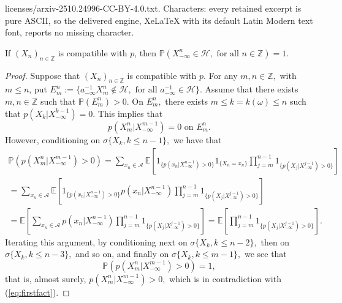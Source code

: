 \documentclass[10pt,a4paper]{amsart}
\def\P{{\mathbb P}}
\newcommand{\A}{\mathcal{A}}
\newcommand{\E}{\mathbb{E}}
\newcommand{\Z}{\mathbb{Z}}
\renewcommand{\H}{\mathcal{H}}
\begin{document}
licenses/arxiv-2510.24996-CC-BY-4.0.txt. Characters: every retained excerpt is pure ASCII, so the delivered engine, XeLaTeX with its default Latin Modern text font, reports no missing character.
\begin{proposition} \label{prop:admissiblehistories} If $(X_n)_{n\in \Z}$ is compatible with $p$, then $
\P(X_{-\infty}^{n} \in \H, \text{ for all } n\in \Z)=1.
$
    
\end{proposition}

\begin{proof}
Suppose that $(X_n)_{n\in \Z}$ is compatible with $p.$ For any $ m, n \in \Z,$ with $m\leq n$, put $E_m^n :=\{a_{-\infty}^{-1} X_{m}^{n} \not\in \H, \text{ for all }a_{-\infty}^{-1}\in \H\} .$ 
Assume that there exists $m,n\in \Z$ such that $\P (E_m^n) > 0. $ On $E_m^n, $ there exists $m\leq k= k ( \omega ) \leq n$ such that $p(X_k|X_{-\infty}^{k-1})=0.$ This implies that 
\begin{equation}\label{eq:firstfact}
p( X_m^{n}| X_{- \infty}^{m-1} ) = 0 \mbox{ on } E_m^n.
\end{equation} 
However, conditioning on $\sigma \{ X_k, k \le n-1 \},$  we have that 
\begin{multline*}
\P ( p( X_m^{n}| X_{- \infty}^{m-1} ) > 0 ) = \sum_{x_n \in \A} \E [ 1_{\{ p ( x_n |X_{- \infty}^{n-1} ) > 0 \}} 1_{\{ X_n = x_n \}}\prod_{j=m}^{n-1} 1_{\{ p ( X_j |X_{- \infty}^{j-1} ) > 0 \}}  ]  \\
=\sum_{x_n \in \A} \E [1_{\{ p ( x_n |X_{- \infty}^{n-1} ) > 0 \}}  p(x_n|X_{- \infty}^{n-1}) \prod_{j=m}^{n-1} 1_{\{ p ( X_j |X_{- \infty}^{j-1} ) > 0 \}}  ]  \\
= \E [ \sum_{x_n \in \A} p(x_n|X_{- \infty}^{n-1}) \prod_{j=m}^{n-1} 1_{\{ p ( X_j |X_{- \infty}^{j-1} ) > 0 \}}  ]  =  \E [  \prod_{j=m}^{n-1} 1_{\{ p ( X_j |X_{- \infty}^{j-1} ) > 0 \}}  ]  .
\end{multline*}
Iterating this argument, by conditioning next on $\sigma \{ X_k, k \le n-2 \},$ then on $\sigma \{ X_k, k \le n-3 \},$ and so on, and finally on $ \sigma \{ X_k, k \le m-1 \} , $
we see that 
$$ \P ( p( X_m^{n}| X_{- \infty}^{m-1} ) > 0 ) = 1 , $$ that is, almost surely, $p( X_m^{n}| X_{- \infty}^{m-1} ) > 0 ,$ which is in contradiction with (\ref{eq:firstfact}).    
\end{proof}
\end{document}
